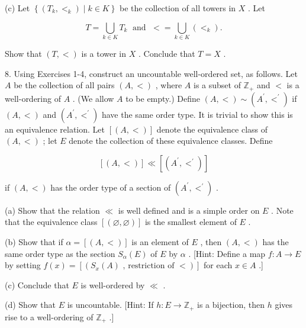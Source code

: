 (c) Let \(\left\{  {\left( {{T}_{k},{ < }_{k}}\right)  \mid  k \in  K}\right\}\) be the collection of all towers in \(X\) . Let

\[
T = \mathop{\bigcup }\limits_{{k \in  K}}{T}_{k}\;\text{ and }\; <  = \mathop{\bigcup }\limits_{{k \in  K}}\left( { < }_{k}\right) .
\]

Show that \(\left( {T, < }\right)\) is a tower in \(X\) . Conclude that \(T = X\) .

8. Using Exercises 1-4, construct an uncountable well-ordered set, as follows. Let \(A\) be the collection of all pairs \(\left( {A, < }\right)\) , where \(A\) is a subset of \({\mathbb{Z}}_{ + }\) and \(<\) is a well-ordering of \(A\) . (We allow \(A\) to be empty.) Define \(\left( {A, < }\right)  \sim  \left( {{A}^{\prime },{ < }^{\prime }}\right)\) if \(\left( {A, < }\right)\) and \(\left( {{A}^{\prime },{ < }^{\prime }}\right)\) have the same order type. It is trivial to show this is an equivalence relation. Let \(\left\lbrack  \left( {A, < }\right) \right\rbrack\) denote the equivalence class of \(\left( {A, < }\right)\) ; let \(E\) denote the collection of these equivalence classes. Define

\[
\left\lbrack  \left( {A, < }\right) \right\rbrack   \ll  \left\lbrack  \left( {{A}^{\prime },{ < }^{\prime }}\right) \right\rbrack
\]

if \(\left( {A, < }\right)\) has the order type of a section of \(\left( {{A}^{\prime },{ < }^{\prime }}\right)\) .

(a) Show that the relation \(\ll\) is well defined and is a simple order on \(E\) . Note that the equivalence class \(\left\lbrack  \left( {\varnothing ,\varnothing }\right) \right\rbrack\) is the smallest element of \(E\) .

(b) Show that if \(\alpha  = \left\lbrack  \left( {A, < }\right) \right\rbrack\) is an element of \(E\) , then \(\left( {A, < }\right)\) has the same order type as the section \({S}_{\alpha }\left( E\right)\) of \(E\) by \(\alpha\) . [Hint: Define a map \(f : A \rightarrow  E\) by setting \(f\left( x\right)  = \left\lbrack  \left( {{S}_{x}\left( A\right) \text{ , restriction of } < }\right) \right\rbrack\) for each \(x \in  A\) .]

(c) Conclude that \(E\) is well-ordered by \(\ll\) .

(d) Show that \(E\) is uncountable. [Hint: If \(h : E \rightarrow  {\mathbb{Z}}_{ + }\) is a bijection, then \(h\) gives rise to a well-ordering of \({\mathbb{Z}}_{ + }\) .]

